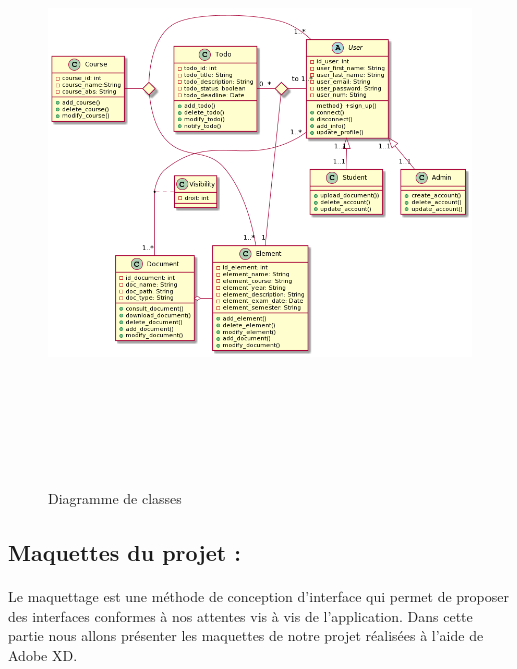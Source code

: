 \documentclass{article}
\begin{document}
{\begin{figure}[H]
    \center
    \includegraphics[width=18.3cm,height=16cm]{CLASSDIAGRAM.png}
    \caption{Diagramme de classes}
    \label{fig:Diagramme de classes.}
\end{figure}

\subsection{Maquettes du projet :}
\onehalfspacing\paragraph{}{Le maquettage est une méthode de conception d'interface qui permet de proposer des interfaces conformes à nos attentes vis à vis de l'application. Dans cette partie nous allons présenter les maquettes de notre projet réalisées à l'aide de Adobe XD. }

}
\end{document}
